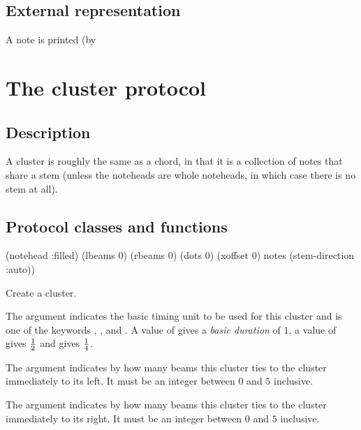 \subsection{External representation}

A note is printed (by 

\section{The cluster protocol}

\subsection{Description}

A cluster is roughly the same as a chord, in that it is a collection
of notes that share a stem (unless the noteheads are whole noteheads,
in which case there is no stem at all).

\subsection{Protocol classes and functions}


 {\key (notehead :filled) (lbeams 0) (rbeams 0)
                       (dots 0) (xoffset 0) notes (stem-direction :auto))}

Create a cluster.

The  argument indicates the basic timing unit to be
used for this cluster and is one of the keywords ,
, and .  A value of 
gives a \emph{basic duration} of $1$, a value of  gives $1
\over 2$ and  gives $1 \over 4$. 

The  argument indicates by how many beams this cluster
ties to the cluster immediately to its left.  It must be an integer
between $0$ and $5$ inclusive. 

The  argument indicates by how many beams this cluster
ties to the cluster immediately to its right.  It must be an integer
between $0$ and $5$ inclusive. 

